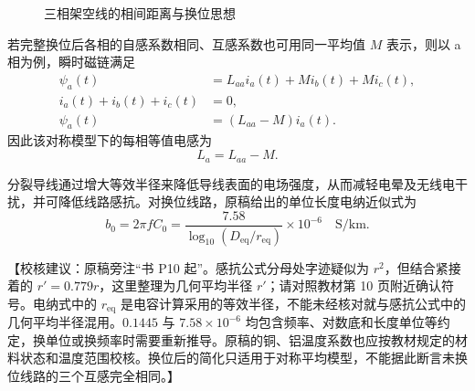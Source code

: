\documentclass[
  12pt,
  UTF8,
  a4paper,
  fontset=fandol,
  oneside,
  openany
]{ctexrep}
\newcommand{\reviewnote}[1]{%
  \par\smallskip
  {\color{reviewgray}\small\noindent【校核建议：#1】\par}
  \smallskip
}
\begin{document}
\begin{figure}[H]
  \centering
  \caption{三相架空线的相间距离与换位思想}
\end{figure}

若完整换位后各相的自感系数相同、互感系数也可用同一平均值 $M$ 表示，则以 a 相为例，瞬时磁链满足
\begin{align}
  \psi_a(t)            & =L_{aa}i_a(t)+M i_b(t)+M i_c(t), \\
  i_a(t)+i_b(t)+i_c(t) & =0,                              \\
  \psi_a(t)            & =(L_{aa}-M)i_a(t).
\end{align}
因此该对称模型下的每相等值电感为
\begin{equation}
  L_a=L_{aa}-M.
\end{equation}

分裂导线通过增大等效半径来降低导线表面的电场强度，从而减轻电晕及无线电干扰，并可降低线路感抗。对换位线路，原稿给出的单位长度电纳近似式为
\begin{equation}
  b_0=2\pi fC_0
  =\frac{7.58}{\log_{10}(D_{\mathrm{eq}}/r_{\mathrm{eq}})}
  \times10^{-6}\quad \mathrm{S/km}.
\end{equation}

\reviewnote{原稿旁注“书 P10 起”。感抗公式分母处字迹疑似为 $r^2$，但结合紧接着的 $r'=0.779r$，这里整理为几何平均半径 $r'$；请对照教材第 10 页附近确认符号。电纳式中的 $r_{\mathrm{eq}}$ 是电容计算采用的等效半径，不能未经核对就与感抗公式中的几何平均半径混用。$0.1445$ 与 $7.58\times10^{-6}$ 均包含频率、对数底和长度单位等约定，换单位或换频率时需要重新推导。原稿的铜、铝温度系数也应按教材规定的材料状态和温度范围校核。换位后的简化只适用于对称平均模型，不能据此断言未换位线路的三个互感完全相同。}

\end{document}
